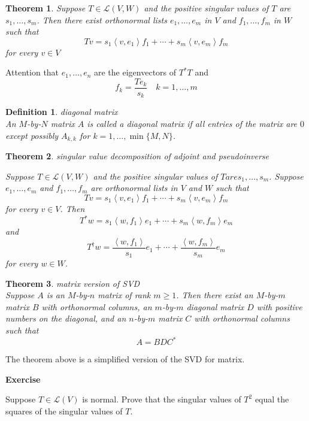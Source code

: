 \documentclass{article}
\newtheorem{theorem}{Theorem}[subsection]
\newtheorem{definition}{Definition}[subsection]
\newenvironment{exercise}{%
{\textbf{Exercise\\}
    }
}{
}
\begin{document}
\begin{CJK}{UTF8}{gkai}
\begin{theorem}
    Suppose $T \in \mathcal{L}(V,W)$ and the positive singular values of $T$ are $s_1,\ldots,s_m$. Then there exist orthonormal lists $e_1,\ldots,e_m$ in $V$ and $f_1,\ldots, f_m$ in $W$ such that
    \[ Tv =s_1\left<v,e_1\right>f_1 + \cdots+s_m\left<v,e_m\right>f_m\]
    for every $v \in V$
\end{theorem}

Attention that $e_1,\ldots,e_n$ are the eigenvectors of $T^\ast T$ and 
\[f_k = \dfrac{T e_k}{s_k}\quad k = 1,\ldots,m\] 

\begin{definition}
    diagonal matrix\\

    An $M$-by-$N$ matrix $A$ is called a diagonal matrix if all entries of the matrix are $0$ except possibly $A_{k,k}$ for $k = 1,\ldots,\min\{M,N\}$.
\end{definition}

\begin{theorem}
    singular value decomposition of adjoint and pseudoinverse

    Suppose $T \in \mathcal{L}(V,W)$ and the positive singular values of $T are s_1,\ldots,s_m$. Suppose $e_1,\ldots,e_m$ and $f_1,\ldots, f_m$ are orthonormal lists in $V$ and $W$ such that
    \[Tv = s_1\left<v,e_1\right>f_1 + \cdots+s_m\left<v,e_m\right>f_m\]
    for every $v \in V$. Then
    \[T^\ast w =s_1\left<w, f_1\right>e_1 + \cdots+s_m\left<w, f_m\right>e_m\]
    and
    \[T^\dagger w = \dfrac{\left<w, f_1\right>}{s_1}e_1 +\cdots+ \dfrac{\left<w, f_m\right>}{s_m}e_m\]
    for every $w \in W$.

\end{theorem}

\begin{theorem}
    matrix version of SVD\\
    
    Suppose $A$ is an $M$-by-$n$ matrix of rank $m \geq 1$. Then there exist an $M$-by-$m$ matrix $B$ with orthonormal columns, an $m$-by-$m$ diagonal matrix $D$ with positive numbers on the diagonal, and an $n$-by-$m$ matrix $C$ with orthonormal columns such that
    \[A =B D C^\ast \]
\end{theorem}
The theorem above is a simplified version of the SVD for matrix.

\begin{exercise}
    Suppose $T \in \mathcal{L}(V)$ is normal. Prove that the singular values of $T^2$ equal the squares of the singular values of $T$.
\end{exercise}


\end{CJK}
\end{document}

